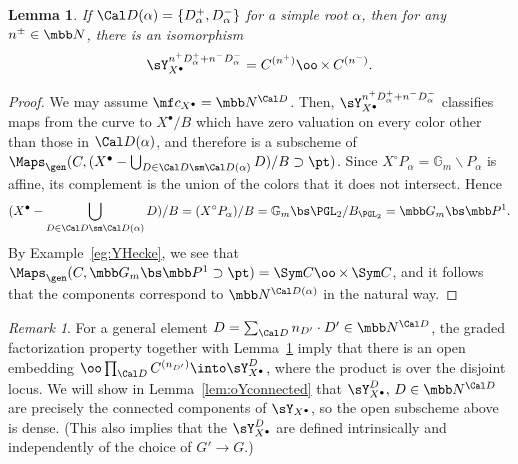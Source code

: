 \documentclass[final]{amsart}
\newtheorem{lem}[subsubsection]{Lemma}
\theoremstyle{remark}
\newtheorem{rem}[subsubsection]{Remark}
\theoremstyle{definition}
\DeclareMathOperator*{\xt}{\times}
\numberwithin{equation}{section}
\begin{document}
\begin{lem} \label{lem:Ycolor}
If $\Cal D(\alpha) = \{ D_\alpha^+, D_\alpha^- \}$ for a simple root $\alpha$,
then for any $n^\pm \in \mbb N$, 
there is an isomorphism 
\[ \sY^{n^+ D_\alpha^+ + n^- D_\alpha^-}_{X^\bullet} = C^{(n^+)}\oo\xt C^{(n^-)}. \]
\end{lem}
\begin{proof} 
We may assume $\mf c_{X^\bullet} = \mbb N^{\Cal D}$. Then, 
$\sY^{n^+ D_\alpha^+ + n^- D_\alpha^-}_{X^\bullet}$
classifies maps from the curve to $X^\bullet/B$ which have zero valuation on every color other than those in $\Cal D(\alpha)$, and therefore is a subscheme of $\Maps_\gen(C, (X^\bullet-\bigcup_{D\in \Cal D \sm \Cal D(\alpha)} D)/B \supset \pt)$. 
Since $X^\circ P_\alpha = \mathbb G_m\backslash P_\alpha$ is affine, its complement is the union of the colors that it does not intersect. Hence 
\[ (X^\bullet-\bigcup_{D\in \Cal D \sm \Cal D(\alpha)}D)/B = (X^\circ P_\alpha)/B = \mathbb G_m\bs\PGL_2/B_{\PGL_2} = \mbb G_m \bs \mbb P^1.\]
By Example~\ref{eg:YHecke}, we see that $\Maps_\gen(C, \mbb G_m \bs \mbb P^1 \supset \pt) = \Sym C \oo\xt \Sym C$,
and it follows that the components correspond to $\mbb N^{\Cal D(\alpha)}$ in
the natural way.
\end{proof}



\begin{rem} \label{rem:Ycomp}
For a general element $D = \sum_{\Cal D} n_{D'}\cdot D' \in \mbb N^{\Cal D}$, 
the graded factorization property together with Lemma~\ref{lem:Ycolor} imply
that there is an open embedding 
$\oo\prod_{\Cal D} C^{(n_{D'})} \into \sY^D_{X^\bullet}$,
where the product is over the disjoint locus. 
We will show in Lemma~\ref{lem:oYconnected} that 
$\sY^D_{X^\bullet},\, D\in \mbb N^{\Cal D}$ are precisely the connected components
of $\sY_{X^\bullet}$, so the open subscheme above is dense. 
(This also implies that the $\sY^D_{X^\bullet}$ are defined intrinsically and independently
of the choice of $G'\to G$.)
\end{rem}
\end{document}
